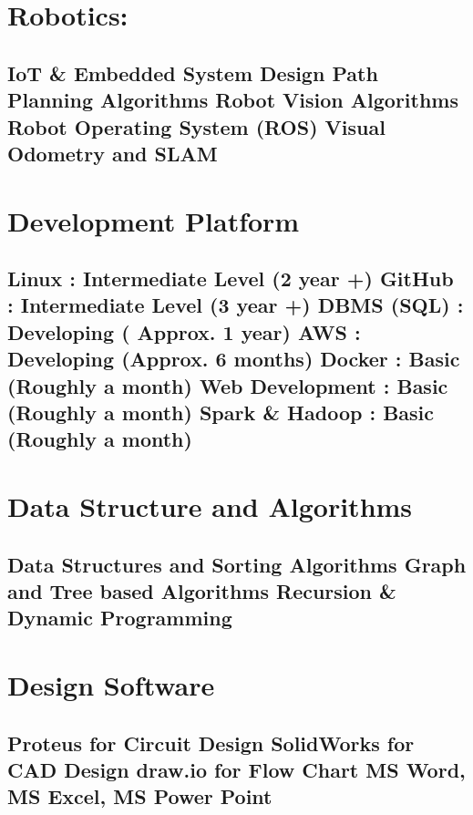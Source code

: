 \documentclass[letterpaper]{twentysecondcv} %
\begin{document}
{\section{\large Robotics:}\subsection{\small  
\textbf{IoT \& Embedded System Design} 
\newline Path Planning Algorithms 
\newline Robot Vision Algorithms 
\newline Robot Operating System \textbf{(ROS)}
\newline \textbf{Visual Odometry and SLAM}}

\section{\large Development Platform} \subsection{\small \textbf{Linux} : Intermediate Level (2 year +) \newline \textbf{GitHub} : Intermediate Level (3 year +) \newline DBMS (SQL) : Developing ( Approx. 1 year)  
\newline AWS : Developing (Approx. 6 months)  
\newline Docker : Basic (Roughly a month)
\newline Web Development : Basic (Roughly a month)
\newline Spark \& Hadoop : Basic (Roughly a month) }

\section{\large Data Structure and Algorithms  }\subsection {\small Data Structures and Sorting Algorithms \newline Graph and Tree based Algorithms \newline Recursion \& Dynamic Programming }

\section{\large Design Software} \subsection{\small Proteus for Circuit Design \newline SolidWorks for CAD Design \newline draw.io for Flow Chart \newline MS Word, MS Excel, MS Power Point}

}
\makeprofilenpage
\end{document}
